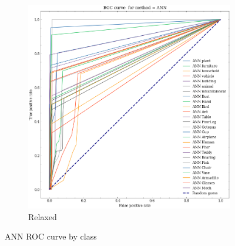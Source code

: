 \begin{figure}
\begin{subfigure}[b]{0.45\textwidth}
            \includegraphics[width=\textwidth]{assets/evaluation_results/ANN/roc_curve_ANN_relaxed.png}
            \caption{Relaxed}
        \end{subfigure}
    \caption{ANN ROC curve by class}
    \label{fig:ann-roc-curve-results}
\end{figure}


